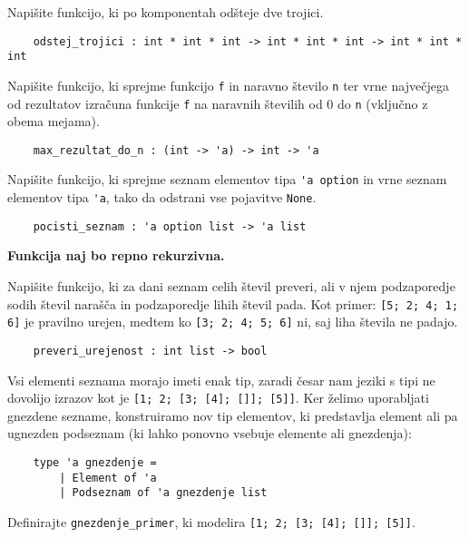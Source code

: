 \documentclass[arhiv]{../izpit}
\begin{document}

\naloga[]

\podnaloga
Napišite funkcijo, ki po komponentah odšteje dve trojici.
\begin{verbatim}
    odstej_trojici : int * int * int -> int * int * int -> int * int * int
\end{verbatim}

\podnaloga
Napišite funkcijo, ki sprejme funkcijo \verb|f| in naravno število \verb|n| ter vrne največjega od rezultatov izračuna funkcije \verb|f| na naravnih številih od 0 do \verb|n| (vključno z obema mejama).
\begin{verbatim}
    max_rezultat_do_n : (int -> 'a) -> int -> 'a
\end{verbatim}

\podnaloga
Napišite funkcijo, ki sprejme seznam elementov tipa \verb|'a option| in vrne seznam elementov tipa \verb|'a|, tako da odstrani vse pojavitve \verb|None|. 
\begin{verbatim}
    pocisti_seznam : 'a option list -> 'a list
\end{verbatim}
\textbf{Funkcija naj bo repno rekurzivna.}

\podnaloga
Napišite funkcijo, ki za dani seznam celih števil preveri, ali v njem podzaporedje sodih števil narašča in podzaporedje lihih števil pada.
Kot primer: \verb|[5; 2; 4; 1; 6]| je pravilno urejen, medtem ko \verb|[3; 2; 4; 5; 6]| ni, saj liha števila ne padajo.
\begin{verbatim}
    preveri_urejenost : int list -> bool
\end{verbatim}


\naloga

Vsi elementi seznama morajo imeti enak tip, zaradi česar nam jeziki s tipi ne dovolijo izrazov kot je \verb|[1; 2; [3; [4]; []]; [5]]|. Ker želimo uporabljati gnezdene sezname, konstruiramo nov tip elementov, ki predstavlja element ali pa ugnezden podseznam (ki lahko ponovno vsebuje elemente ali gnezdenja):

\begin{verbatim}
    type 'a gnezdenje =
        | Element of 'a
        | Podseznam of 'a gnezdenje list
\end{verbatim}

\podnaloga
Definirajte \verb|gnezdenje_primer|, ki modelira \verb|[1; 2; [3; [4]; []]; [5]]|.
\end{document}
